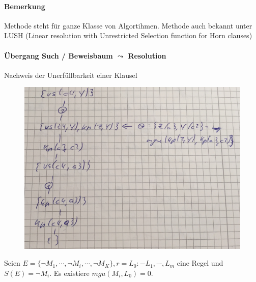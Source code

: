 \documentclass[12pt, a4paper]{article}
\begin{document}
\paragraph{Bemerkung} Methode steht für ganze Klasse von Algortihmen. Methode auch bekannt unter LUSH (Linear resolution with Unrestricted Selection function for Horn clauses) \\
\paragraph{Übergang Such / Beweisbaum $\leadsto$ Resolution}
Nachweis der Unerfüllbarkeit einer Klausel

\begin{figure}[h!]
\centering
\includegraphics[width=0.7\linewidth]{img/img9}
\caption{}
\label{fig:img9}
\end{figure}


Seien $E = \{ \lnot M_1, \cdots, \lnot M_i, \cdots, \lnot M_K \}, r = L_0 :- L_1, \cdots, L_m$ eine Regel und $S(E) = \lnot M_i$. Es existiere $mgu(M_i, L_0) = 0$.
\end{document}
